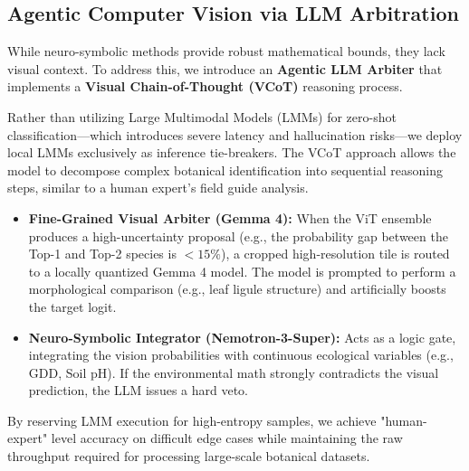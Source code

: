 \documentclass[10pt,twocolumn,letterpaper]{article}
\begin{document}
\subsection{Agentic Computer Vision via LLM Arbitration}
While neuro-symbolic methods provide robust mathematical bounds, they lack visual context. To address this, we introduce an \textbf{Agentic LLM Arbiter} that implements a \textbf{Visual Chain-of-Thought (VCoT)} reasoning process. 

Rather than utilizing Large Multimodal Models (LMMs) for zero-shot classification—which introduces severe latency and hallucination risks—we deploy local LMMs exclusively as inference tie-breakers. The VCoT approach allows the model to decompose complex botanical identification into sequential reasoning steps, similar to a human expert's field guide analysis.
\begin{itemize}
    \item \textbf{Fine-Grained Visual Arbiter (Gemma 4):} When the ViT ensemble produces a high-uncertainty proposal (e.g., the probability gap between the Top-1 and Top-2 species is $<15\%$), a cropped high-resolution tile is routed to a locally quantized Gemma 4 model. The model is prompted to perform a morphological comparison (e.g., leaf ligule structure) and artificially boosts the target logit.
    \item \textbf{Neuro-Symbolic Integrator (Nemotron-3-Super):} Acts as a logic gate, integrating the vision probabilities with continuous ecological variables (e.g., GDD, Soil pH). If the environmental math strongly contradicts the visual prediction, the LLM issues a hard veto.
\end{itemize}
By reserving LMM execution for high-entropy samples, we achieve "human-expert" level accuracy on difficult edge cases while maintaining the raw throughput required for processing large-scale botanical datasets.
\end{document}
